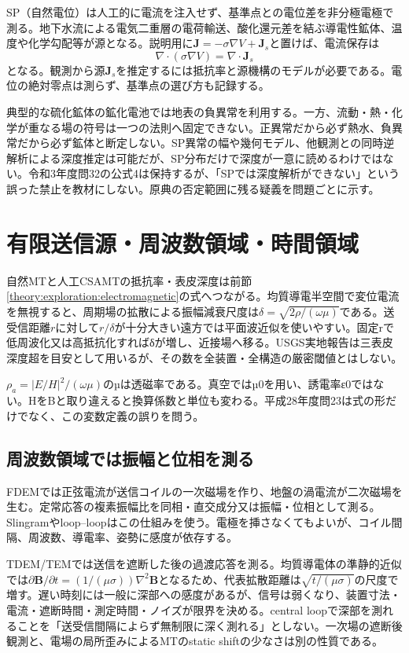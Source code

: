 SP（自然電位）は人工的に電流を注入せず、基準点との電位差を非分極電極で測る。地下水流による電気二重層の電荷輸送、酸化還元差を結ぶ導電性鉱体、温度や化学勾配等が源となる。説明用に\(\boldsymbol J=-\sigma\nabla V+\boldsymbol J_s\)と置けば、電流保存は
\[
 \nabla\cdot(\sigma\nabla V)=\nabla\cdot\boldsymbol J_s
\]
となる。観測から源\(\boldsymbol J_s\)を推定するには抵抗率と源機構のモデルが必要である。電位の絶対零点は測らず、基準点の選び方も記録する。

典型的な硫化鉱体の鉱化電池では地表の負異常を利用する。一方、流動・熱・化学が重なる場の符号は一つの法則へ固定できない。正異常だから必ず熱水、負異常だから必ず鉱体と断定しない。SP異常の幅や幾何モデル、他観測との同時逆解析による深度推定は可能だが、SP分布だけで深度が一意に読めるわけではない\cite{epa_sp}。令和3年度問32の公式4は保持するが、「SPでは深度解析ができない」という誤った禁止を教材にしない。原典の否定範囲に残る疑義を問題ごとに示す。

\section{有限送信源・周波数領域・時間領域}
\label{theory:exploration:nearfield}
自然MTと人工CSAMTの抵抗率・表皮深度は前節\ref{theory:exploration:electromagnetic}の式へつながる。均質導電半空間で変位電流を無視すると、周期場の拡散による振幅減衰尺度は\(\delta=\sqrt{2\rho/(\omega\mu)}\)である。送受信距離\(r\)に対して\(r/\delta\)が十分大きい遠方では平面波近似を使いやすい。固定rで低周波化又は高抵抗化すればδが増し、近接場へ移る。USGS実地報告は三表皮深度超を目安として用いるが、その数を全装置・全構造の厳密閾値とはしない\cite{usgs_csamt2012}。

\(\rho_a=|E/H|^2/(\omega\mu)\)のµは透磁率である。真空ではµ0を用い、誘電率ε0ではない。HをBと取り違えると換算係数と単位も変わる。平成28年度問23は式の形だけでなく、この変数定義の誤りを問う。

\subsection*{周波数領域では振幅と位相を測る}
\label{theory:exploration:fdtd}
FDEMでは正弦電流が送信コイルの一次磁場を作り、地盤の渦電流が二次磁場を生む。定常応答の複素振幅比を同相・直交成分又は振幅・位相として測る。Slingramやloop--loopはこの仕組みを使う。電極を挿さなくてもよいが、コイル間隔、周波数、導電率、姿勢に感度が依存する\cite{epa_fdem}。

TDEM/TEMでは送信を遮断した後の過渡応答を測る。均質導電体の準静的近似では\(\partial\boldsymbol B/\partial t=(1/(\mu\sigma))\nabla^2\boldsymbol B\)となるため、代表拡散距離は\(\sqrt{t/(\mu\sigma)}\)の尺度で増す。遅い時刻には一般に深部への感度があるが、信号は弱くなり、装置寸法・電流・遮断時間・測定時間・ノイズが限界を決める。central loopで深部を測れることを「送受信間隔によらず無制限に深く測れる」としない\cite{epa_tdem_archive}。一次場の遮断後観測と、電場の局所歪みによるMTのstatic shiftの少なさは別の性質である。

